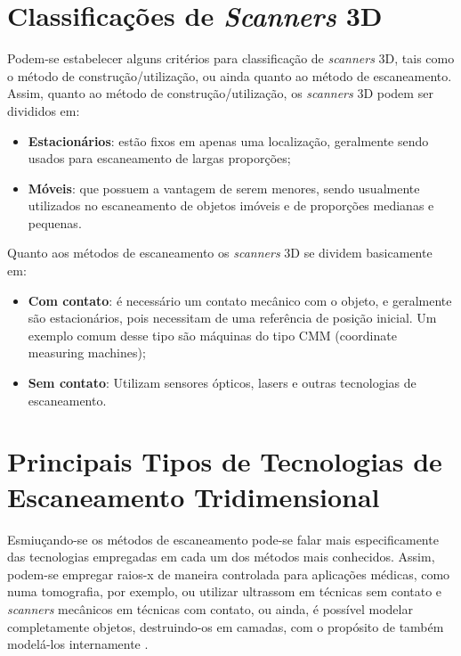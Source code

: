 \section{Classificações de \textit{Scanners} 3D}

Podem-se estabelecer alguns critérios para classificação de \textit{scanners} 3D, tais como o método de construção/utilização, ou ainda quanto ao método de escaneamento. Assim, quanto ao método de construção/utilização, os \textit{scanners} 3D podem ser divididos em:

\begin{itemize}
\item \textbf{Estacionários}: estão fixos em apenas uma localização, geralmente sendo usados para escaneamento de largas proporções;

\item \textbf{Móveis}: que possuem a vantagem de serem menores, sendo usualmente utilizados no escaneamento de objetos imóveis e de proporções medianas e pequenas.
\end{itemize}

Quanto aos métodos de escaneamento os \textit{scanners} 3D se dividem basicamente em:

\begin{itemize}
\item \textbf{Com contato}: é necessário um contato mecânico com o objeto, e geralmente são estacionários, pois necessitam de uma referência de posição inicial. Um exemplo comum desse tipo são máquinas do tipo CMM (coordinate measuring machines);

\item \textbf{Sem contato}: Utilizam sensores ópticos, lasers e outras tecnologias de escaneamento. 
\end{itemize}

\section{Principais Tipos de Tecnologias de Escaneamento Tridimensional}

Esmiuçando-se os métodos de escaneamento pode-se falar mais especificamente das tecnologias empregadas em cada um dos métodos mais conhecidos. Assim, podem-se empregar raios-x de maneira controlada para aplicações médicas, como numa tomografia, por exemplo, ou utilizar ultrassom em técnicas sem contato e \textit{scanners} mecânicos em técnicas com contato, ou ainda, é possível modelar completamente objetos, destruindo-os em camadas, com o propósito de também modelá-los internamente \cite{toth_comparison_2014}.

